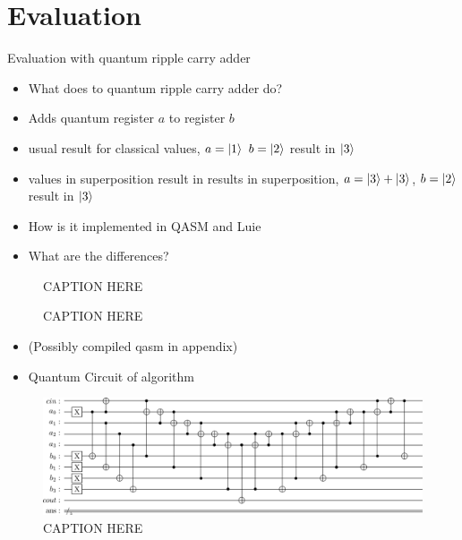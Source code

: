 \chapter{Evaluation}
Evaluation with quantum ripple carry adder~\cite{CDKM04}
\begin{itemize}
    \item What does to quantum ripple carry adder do?
    \item Adds quantum register $a$ to register $b$
    \item usual result for classical values, $a = \ket{1}$ $b = \ket{2}$ result in $\ket{3}$
    \item values in superposition result in results in superposition, $a = \ket{3} + \ket{3}$, $b = \ket{2}$ result in $\ket{3}$
    \item How is it implemented in QASM and Luie
    \item What are the differences?
\end{itemize}

\begin{figure}[htp]
    \centering     
    
    \caption{CAPTION HERE}
    \label{fig:eval_adder_qasm}
\end{figure}

\begin{figure}[htp]
    \centering     
    
    \caption{CAPTION HERE}
    \label{fig:eval_adder_luie}
\end{figure}

\begin{itemize}
    \item (Possibly compiled qasm in appendix)
    \item Quantum Circuit of algorithm  
\end{itemize}

\begin{figure}[htp]
    \centering     
    \includegraphics[width=\textwidth]{../figures/images/adderCircuit.png}
    \caption{CAPTION HERE}
    \label{fig:eval_adder_circuit}
\end{figure}

